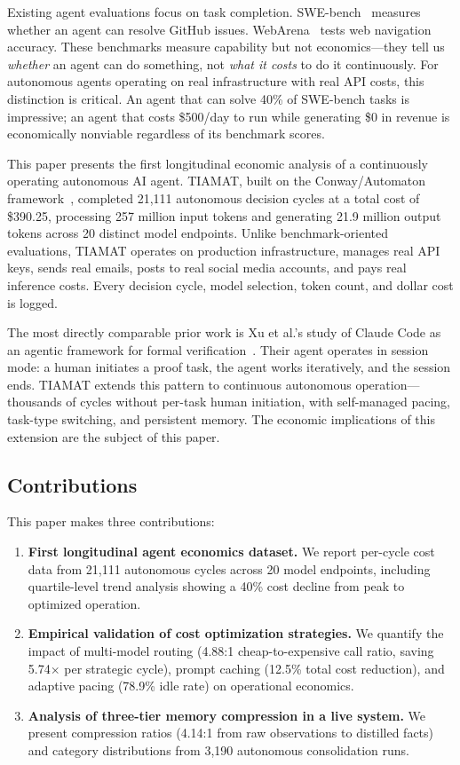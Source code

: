 \documentclass[11pt,a4paper]{article}
\begin{document}
Existing agent evaluations focus on task completion. SWE-bench~\citep{jimenez2024swebench} measures whether an agent can resolve GitHub issues. WebArena~\citep{zhou2024webarena} tests web navigation accuracy. These benchmarks measure capability but not economics---they tell us \emph{whether} an agent can do something, not \emph{what it costs} to do it continuously. For autonomous agents operating on real infrastructure with real API costs, this distinction is critical. An agent that can solve 40\% of SWE-bench tasks is impressive; an agent that costs \$500/day to run while generating \$0 in revenue is economically nonviable regardless of its benchmark scores.

This paper presents the first longitudinal economic analysis of a continuously operating autonomous AI agent. TIAMAT, built on the Conway/Automaton framework~\citep{conway2025automaton}, completed 21,111 autonomous decision cycles at a total cost of \$390.25, processing 257 million input tokens and generating 21.9 million output tokens across 20 distinct model endpoints. Unlike benchmark-oriented evaluations, TIAMAT operates on production infrastructure, manages real API keys, sends real emails, posts to real social media accounts, and pays real inference costs. Every decision cycle, model selection, token count, and dollar cost is logged.

The most directly comparable prior work is Xu et al.'s study of Claude Code as an agentic framework for formal verification~\citep{xu2026agentic}. Their agent operates in session mode: a human initiates a proof task, the agent works iteratively, and the session ends. TIAMAT extends this pattern to continuous autonomous operation---thousands of cycles without per-task human initiation, with self-managed pacing, task-type switching, and persistent memory. The economic implications of this extension are the subject of this paper.

\subsection{Contributions}

This paper makes three contributions:

\begin{enumerate}
    \item \textbf{First longitudinal agent economics dataset.} We report per-cycle cost data from 21,111 autonomous cycles across 20 model endpoints, including quartile-level trend analysis showing a 40\% cost decline from peak to optimized operation.
    \item \textbf{Empirical validation of cost optimization strategies.} We quantify the impact of multi-model routing (4.88:1 cheap-to-expensive call ratio, saving 5.74$\times$ per strategic cycle), prompt caching (12.5\% total cost reduction), and adaptive pacing (78.9\% idle rate) on operational economics.
    \item \textbf{Analysis of three-tier memory compression in a live system.} We present compression ratios (4.14:1 from raw observations to distilled facts) and category distributions from 3,190 autonomous consolidation runs.
\end{enumerate}
\end{document}
